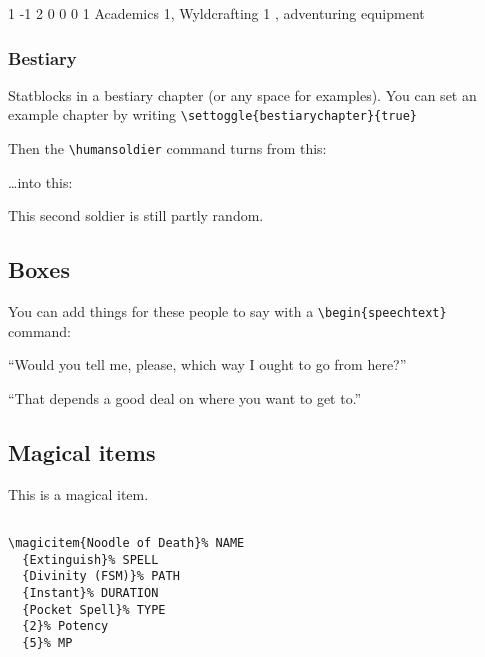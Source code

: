 \documentclass[a4paper,openany]{book}
\begin{document}
\begin{multicols}{2}
\begin{verbatim}
\end{verbatim}

{1}%
{-1}%
{{2}%
{0}%
{0}}%
{0}%
{1}%
{Academics 1, Wyldcrafting 1}%
{\longsword, adventuring equipment}%
{}

\subsubsection{Bestiary}

Statblocks in a bestiary chapter (or any space for examples).
You can set an example chapter by writing \verb"\settoggle{bestiarychapter}{true}"

Then the \verb"\humansoldier" command turns from this:

\humansoldier

\ldots into this:


\humansoldier

This second soldier is still partly random.

\subsection{Boxes}

You can add things for these people to say with a \verb"\begin{speechtext}" command:

\begin{speechtext}

  ``Would you tell me, please, which way I ought to go from here?''

  ``That depends a good deal on where you want to get to.''

\end{speechtext}

\subsection{Magical items}

This is a magical item.

\begin{verbatim}

\magicitem{Noodle of Death}% NAME
  {Extinguish}% SPELL
  {Divinity (FSM)}% PATH
  {Instant}% DURATION
  {Pocket Spell}% TYPE
  {2}% Potency
  {5}% MP

\end{verbatim}


\end{multicols}
\end{document}

